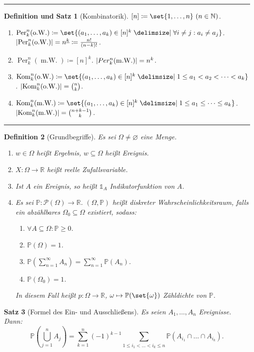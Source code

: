 \documentclass[a4paper]{article}
\newcounter{Sec}
\theoremstyle{marginbreak}
\newtheorem{definition}{Definition}[Sec]
\newtheorem{satz}[definition]{Satz}
\newtheorem{defsatz}[definition]{Definition und Satz}
\newcommand{\sep}{%
	\rule{\textwidth}{0.3pt}%
	\stepcounter{Sec}%
	}
\DeclareMathOperator{\Per}{Per}
\DeclareMathOperator{\Kom}{Kom}
\DeclareMathOperator{\mW}{m.W.}
\DeclareMathOperator{\oW}{o.W.}
\renewcommand{\P}{\mathbb{P}}
\newcommand{\R}{\mathbb{R}}
\newcommand{\N}{\mathbb{N}}
\begin{document}
	\sep
	\begin{defsatz}[Kombinatorik]
		$[n]\coloneqq\set{1,\ldots,n}~(n\in\N)$.
		\begin{enumerate}[label=(\alph*)]
			\item $\Per^n_k(\oW)\coloneqq\set{(a_1,\ldots,a_k)\in[n]^k\given \forall i\neq j: a_i\neq a_j}$.
				$\abs{\Per^n_k(\oW)} = n^{\underline{k}} \coloneqq \frac{n!}{(n-k)!}$.
			\item $\Per^n_k(\mW)\coloneqq [n]^k$. $\abs{Per^n_k(\mW)} = n^k$.
			\item $\Kom^n_k(\oW)\coloneqq \set{(a_1,\ldots,a_k)\in[n]^k\given 1\leq a_1 < a_2 <\dots <a_k}$. $\abs{\Kom^n_k(\oW)} = \binom{n}{k}$.
			\item $\Kom^n_k(\mW)\coloneqq \set{(a_1,\ldots,a_k)\in[n]^k\given 1\leq a_1 \leq \dots\leq a_k}$.
				$\abs{\Kom^n_k(\mW)} = \binom{n+k-1}{k}$.
		\end{enumerate}
	\end{defsatz}
	\sep
	\begin{definition}[Grundbegriffe]
		Es sei $\Omega\neq\varnothing$ eine Menge.
		\begin{enumerate}[label=(\alph*)]
			\item $w\in\Omega$ heißt Ergebnis, $w\subseteq\Omega$ heißt Ereignis.
			\item $X\colon\Omega\to\R$ heißt reelle Zufallsvariable.
			\item Ist $A$ ein Ereignis, so heißt $\mathds{1}_A$ Indikatorfunktion von $A$.
			\item Es sei $\P\colon \mathcal{P}(\Omega)\to\R$. $(\Omega, \P)$ heißt
				diskreter Wahrscheinlichkeitsraum, falls ein abzählbares $\Omega_0\subseteq\Omega$ existiert, sodass:
				\begin{enumerate}[label=(P\arabic*)]
					\item $\forall A\subseteq\Omega: \P\geq 0$.
					\item $\P(\Omega)=1$.
					\item $\P\left(\sum_{n=1}^\infty A_n\right) = \sum_{n=1}^\infty\P(A_n)$.
					\item $\P(\Omega_0) = 1$.
				\end{enumerate}
				In diesem Fall heißt $p\colon\Omega\to\R$, $\omega\mapsto\P(\set{\omega})$ Zähldichte von $\P$.
		\end{enumerate}
	\end{definition}
	\begin{satz}[Formel des Ein- und Ausschließens]
		Es seien $A_1,\ldots,A_n$ Ereignisse. Dann:
		\begin{equation*}
			\P\left(\bigcup_{j=1}^nA_j\right) = \sum_{k=1}^n (-1)^{k-1}\sum_{1\leq i_1<\ldots<i_k\leq n}\P(A_{i_1}\cap\dots\cap A_{i_k}).
		\end{equation*}
	\end{satz}
\end{document}

